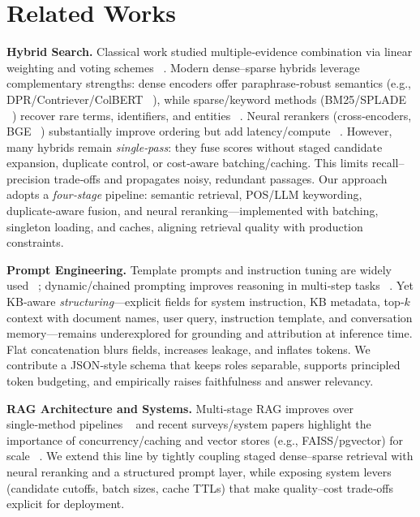 \documentclass[10pt,twocolumn,letterpaper]{article}
\begin{document}
\section{Related Works}

\textbf{Hybrid Search.}
Classical work studied multiple‑evidence combination via linear weighting and voting schemes  ~\cite{lee1997combining}. Modern dense–sparse hybrids leverage complementary strengths: dense encoders offer paraphrase‑robust semantics (e.g., DPR/Contriever/ColBERT  ~\cite{karpukhin2020dpr,izacard2021contriever,khattab2020colbert}), while sparse/keyword methods (BM25/SPLADE  ~\cite{robertson2009bm25,formal2021splade}) recover rare terms, identifiers, and entities  ~\cite{gao2021retrieval}. Neural rerankers (cross‑encoders, BGE  ~\cite{nogueira2019rerankbert,xu2023bge}) substantially improve ordering but add latency/compute  ~\cite{mao2023neural}. However, many hybrids remain \emph{single‑pass}: they fuse scores without staged candidate expansion, duplicate control, or cost‑aware batching/caching. This limits recall–precision trade‑offs and propagates noisy, redundant passages. Our approach adopts a \emph{four‑stage} pipeline: semantic retrieval, POS/LLM keywording, duplicate‑aware fusion, and neural reranking—implemented with batching, singleton loading, and caches, aligning retrieval quality with production constraints.

\vspace{0.5em}
\textbf{Prompt Engineering.}
Template prompts and instruction tuning are widely used  ~\cite{wei2022chain}; dynamic/chained prompting improves reasoning in multi‑step tasks ~\cite{liu2023chained,wang2022selfconsistency,yao2023react}. Yet KB‑aware \emph{structuring}—explicit fields for system instruction, KB metadata, top‑$k$ context with document names, user query, instruction template, and conversation memory—remains underexplored for grounding and attribution at inference time. Flat concatenation blurs fields, increases leakage, and inflates tokens. We contribute a JSON‑style schema that keeps roles separable, supports principled token budgeting, and empirically raises faithfulness and answer relevancy.

\vspace{0.5em}
\textbf{RAG Architecture and Systems.}
Multi‑stage RAG improves over single‑method pipelines ~\cite{gao2021retrieval,lewis2020retrieval} and recent surveys/system papers highlight the importance of concurrency/caching and vector stores (e.g., FAISS/pgvector) for scale ~\cite{gao2021retrieval,johnson2019faiss,pgvector2021,zhang2024semantic,liu2024impact}. We extend this line by tightly coupling staged dense–sparse retrieval with neural reranking and a structured prompt layer, while exposing system levers (candidate cutoffs, batch sizes, cache TTLs) that make quality–cost trade‑offs explicit for deployment.
\end{document}
